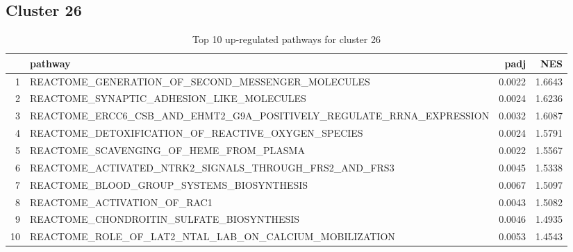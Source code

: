 \documentclass{article}
\begin{document}
\subsection{Cluster 26 }
\begin{table}[H]
\centering
\begin{tabularx}{\textwidth}{rlrr}
  \hline
 & pathway & padj & NES \\ 
  \hline
1 & REACTOME\_GENERATION\_OF\_SECOND\_MESSENGER\_MOLECULES & 0.0022 & 1.6643 \\ 
  2 & REACTOME\_SYNAPTIC\_ADHESION\_LIKE\_MOLECULES & 0.0024 & 1.6236 \\ 
  3 & REACTOME\_ERCC6\_CSB\_AND\_EHMT2\_G9A\_POSITIVELY\_REGULATE\_RRNA\_EXPRESSION & 0.0032 & 1.6087 \\ 
  4 & REACTOME\_DETOXIFICATION\_OF\_REACTIVE\_OXYGEN\_SPECIES & 0.0024 & 1.5791 \\ 
  5 & REACTOME\_SCAVENGING\_OF\_HEME\_FROM\_PLASMA & 0.0022 & 1.5567 \\ 
  6 & REACTOME\_ACTIVATED\_NTRK2\_SIGNALS\_THROUGH\_FRS2\_AND\_FRS3 & 0.0045 & 1.5338 \\ 
  7 & REACTOME\_BLOOD\_GROUP\_SYSTEMS\_BIOSYNTHESIS & 0.0067 & 1.5097 \\ 
  8 & REACTOME\_ACTIVATION\_OF\_RAC1 & 0.0043 & 1.5082 \\ 
  9 & REACTOME\_CHONDROITIN\_SULFATE\_BIOSYNTHESIS & 0.0046 & 1.4935 \\ 
  10 & REACTOME\_ROLE\_OF\_LAT2\_NTAL\_LAB\_ON\_CALCIUM\_MOBILIZATION & 0.0053 & 1.4543 \\ 
   \hline
\end{tabularx}
\caption{Top 10 up-regulated pathways for cluster 26} 
\label{tab:q3_2_26}
\end{table}
\end{document}
